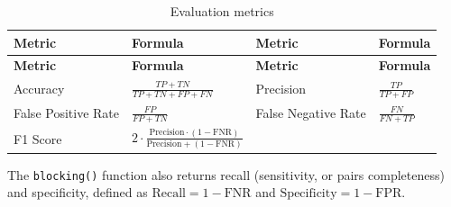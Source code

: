 \begin{longtable}[]{@{}
  >{\raggedright\arraybackslash}p{}
  >{\raggedright\arraybackslash}p{}
  >{\raggedright\arraybackslash}p{}
  >{\raggedright\arraybackslash}p{}@{}}
\caption{\label{tab:eval-metrics} Evaluation metrics}\tabularnewline
\toprule\noalign{}
\begin{minipage}[b]{\linewidth}\raggedright
\textbf{Metric}
\end{minipage} & \begin{minipage}[b]{\linewidth}\raggedright
\textbf{Formula}
\end{minipage} & \begin{minipage}[b]{\linewidth}\raggedright
\textbf{Metric}
\end{minipage} & \begin{minipage}[b]{\linewidth}\raggedright
\textbf{Formula}
\end{minipage} \\
\midrule\noalign{}
\endfirsthead
\toprule\noalign{}
\begin{minipage}[b]{\linewidth}\raggedright
\textbf{Metric}
\end{minipage} & \begin{minipage}[b]{\linewidth}\raggedright
\textbf{Formula}
\end{minipage} & \begin{minipage}[b]{\linewidth}\raggedright
\textbf{Metric}
\end{minipage} & \begin{minipage}[b]{\linewidth}\raggedright
\textbf{Formula}
\end{minipage} \\
\midrule\noalign{}
\endhead
\bottomrule\noalign{}
\endlastfoot
Accuracy & \(\frac{TP + TN}{TP + TN + FP + FN}\) & Precision & \(\frac{TP}{TP + FP}\) \\
False Positive Rate & \(\frac{FP}{FP + TN}\) & False Negative Rate & \(\frac{FN}{FN + TP}\) \\
F1 Score & \(2 \cdot \frac{\text{Precision} \cdot (1 - \text{FNR})}{\text{Precision} + (1 - \text{FNR})}\) & & \\
\end{longtable}

The \texttt{blocking()} function also returns recall (sensitivity, or pairs
completeness) and specificity, defined as
\(\text{Recall} = 1 - \text{FNR}\) and
\(\text{Specificity} = 1 - \text{FPR}\).

